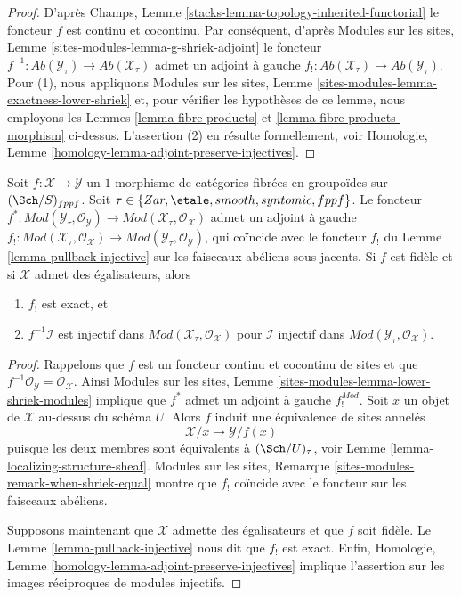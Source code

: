 \begin{proof}
D'après
Champs, Lemme \ref{stacks-lemma-topology-inherited-functorial}
le foncteur $f$ est continu et cocontinu. Par conséquent, d'après
Modules sur les sites, Lemme \ref{sites-modules-lemma-g-shriek-adjoint}
le foncteur
$f^{-1} : \textit{Ab}(\mathcal{Y}_\tau) \to \textit{Ab}(\mathcal{X}_\tau)$
admet un adjoint à gauche
$f_! : \textit{Ab}(\mathcal{X}_\tau) \to \textit{Ab}(\mathcal{Y}_\tau)$.
Pour (1), nous appliquons
Modules sur les sites, Lemme \ref{sites-modules-lemma-exactness-lower-shriek}
et, pour vérifier les hypothèses de ce lemme, nous employons les
Lemmes \ref{lemma-fibre-products} et
\ref{lemma-fibre-products-morphism}
ci-dessus. L'assertion (2) en résulte formellement, voir
Homologie, Lemme \ref{homology-lemma-adjoint-preserve-injectives}.
\end{proof}

\begin{lemma}
\label{lemma-pullback-injective-modules}
Soit $f : \mathcal{X} \to \mathcal{Y}$ un $1$-morphisme de catégories
fibrées en groupoïdes sur $(\Sch/S)_{fppf}$. Soit
$\tau \in \{Zar, \etale, smooth, syntomic, fppf\}$.
Le foncteur
$f^* : \textit{Mod}(\mathcal{Y}_\tau, \mathcal{O}_\mathcal{Y}) \to
\textit{Mod}(\mathcal{X}_\tau, \mathcal{O}_\mathcal{X})$
admet un adjoint à gauche
$f_! : \textit{Mod}(\mathcal{X}_\tau, \mathcal{O}_\mathcal{X}) \to
\textit{Mod}(\mathcal{Y}_\tau, \mathcal{O}_\mathcal{Y})$, qui
coïncide avec le foncteur $f_!$ du Lemme \ref{lemma-pullback-injective}
sur les faisceaux abéliens sous-jacents.
Si $f$ est fidèle et si $\mathcal{X}$ admet des égalisateurs, alors
\begin{enumerate}
\item $f_!$ est exact, et
\item $f^{-1}\mathcal{I}$ est injectif dans
$\textit{Mod}(\mathcal{X}_\tau, \mathcal{O}_\mathcal{X})$
pour $\mathcal{I}$ injectif dans
$\textit{Mod}(\mathcal{Y}_\tau, \mathcal{O}_\mathcal{X})$.
\end{enumerate}
\end{lemma}

\begin{proof}
Rappelons que $f$ est un foncteur continu et cocontinu de sites
et que $f^{-1}\mathcal{O}_\mathcal{Y} = \mathcal{O}_\mathcal{X}$. Ainsi
Modules sur les sites, Lemme \ref{sites-modules-lemma-lower-shriek-modules}
implique que $f^*$ admet un adjoint à gauche $f_!^{Mod}$.
Soit $x$ un objet de $\mathcal{X}$ au-dessus du schéma $U$.
Alors $f$ induit une équivalence de sites annelés
$$
\mathcal{X}/x \longrightarrow \mathcal{Y}/f(x)
$$
puisque les deux membres sont équivalents à $(\Sch/U)_\tau$, voir
Lemme \ref{lemma-localizing-structure-sheaf}.
Modules sur les sites, Remarque \ref{sites-modules-remark-when-shriek-equal}
montre que $f_!$ coïncide avec le foncteur sur les faisceaux abéliens.

\medskip\noindent
Supposons maintenant que $\mathcal{X}$ admette des égalisateurs et que $f$ soit fidèle.
Le Lemme \ref{lemma-pullback-injective}
nous dit que $f_!$ est exact. Enfin,
Homologie, Lemme \ref{homology-lemma-adjoint-preserve-injectives}
implique l'assertion sur les images réciproques de modules injectifs.
\end{proof}




